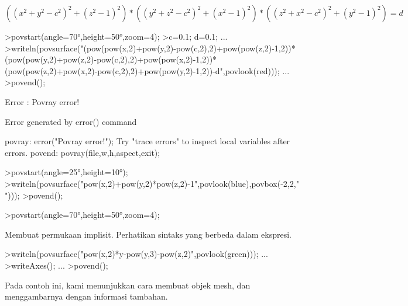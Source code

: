 \documentclass[a4paper,10pt]{article}
\begin{document}
\begin{eulernotebook}
\begin{eulercomment}
\begin{eulercomment}
\begin{eulercomment}
\begin{eulercomment}
\begin{eulercomment}
\begin{eulercomment}
\begin{eulercomment}
\begin{eulercomment}
\begin{eulercomment}
\begin{eulercomment}
\begin{eulercomment}
\begin{eulercomment}
\begin{eulercomment}
\begin{eulercomment}
\begin{eulercomment}
\begin{eulercomment}
\begin{eulercomment}
\end{eulercomment}
\begin{eulerformula}
\[
((x^2+y^2-c^2)^2+(z^2-1)^2)*((y^2+z^2-c^2)^2+(x^2-1)^2)*((z^2+x^2-c^2)^2+(y^2-1)^2)=d
\]
\end{eulerformula}
\begin{eulerprompt}
>povstart(angle=70°,height=50°,zoom=4);
>c=0.1; d=0.1; ...
>writeln(povsurface("(pow(pow(x,2)+pow(y,2)-pow(c,2),2)+pow(pow(z,2)-1,2))*(pow(pow(y,2)+pow(z,2)-pow(c,2),2)+pow(pow(x,2)-1,2))*(pow(pow(z,2)+pow(x,2)-pow(c,2),2)+pow(pow(y,2)-1,2))-d",povlook(red))); ...
>povend();
\end{eulerprompt}
\begin{euleroutput}
  Error : Povray error!
  
  Error generated by error() command
  
  povray:
      error("Povray error!");
  Try "trace errors" to inspect local variables after errors.
  povend:
      povray(file,w,h,aspect,exit); 
\end{euleroutput}
\begin{eulerprompt}
>povstart(angle=25°,height=10°); 
>writeln(povsurface("pow(x,2)+pow(y,2)*pow(z,2)-1",povlook(blue),povbox(-2,2,"")));
>povend();
\end{eulerprompt}
\begin{eulerprompt}
>povstart(angle=70°,height=50°,zoom=4);
\end{eulerprompt}
\begin{eulercomment}
Membuat permukaan implisit. Perhatikan sintaks yang berbeda dalam
ekspresi.
\end{eulercomment}
\begin{eulerprompt}
>writeln(povsurface("pow(x,2)*y-pow(y,3)-pow(z,2)",povlook(green))); ...
>writeAxes(); ...
>povend();
\end{eulerprompt}
\begin{eulercomment}
Pada contoh ini, kami menunjukkan cara membuat objek mesh, dan
menggambarnya dengan informasi tambahan.


\end{eulercomment}
\end{eulercomment}
\end{eulercomment}
\end{eulercomment}
\end{eulercomment}
\end{eulercomment}
\end{eulercomment}
\end{eulercomment}
\end{eulercomment}
\end{eulercomment}
\end{eulercomment}
\end{eulercomment}
\end{eulercomment}
\end{eulercomment}
\end{eulercomment}
\end{eulercomment}
\end{eulercomment}
\end{eulernotebook}
\end{document}
